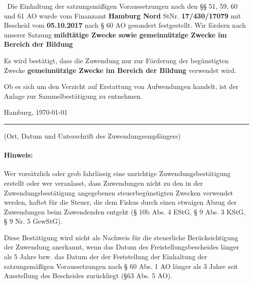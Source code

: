 \documentclass[12pt,ngerman]{scrartcl}
\newcommand{\marked}{\scalebox{1.5}{\XBox}~} %
\begin{document}
{{{\marked Die Einhaltung der satzungsmäßigen Voraussetzungen nach den §§ 51, 59, 60 und 61 AO wurde vom Finanzamt \textbf{Hamburg Nord} StNr. \textbf{17/430/17079} mit Bescheid vom \textbf{05.10.2017} nach § 60 AO gesondert festgestellt. Wir fördern nach unserer Satzung \textbf{mildtätige Zwecke sowie gemeinnützige Zwecke im Bereich der Bildung}
 
\begin{mdframed}[style=MyFormStyle]%
  Es wird bestätigt, dass die Zuwendung nur zur Förderung der
  begünstigten Zwecke \textbf{gemeinnützige Zwecke im Bereich der Bildung}
  verwendet wird.
\end{mdframed} 

{%

\vspace*{0.5em}Ob es sich um den Verzicht auf Erstattung von Aufwendungen handelt, ist der Anlage zur Sammelbestätigung zu entnehmen. {%

\vspace*{2.5em} 
Hamburg, \today
\hrule

\vspace*{0.5em} (Ort, Datum und Unterschrift des Zuwendungsempfängers) 

\paragraph{Hinweis:} Wer vorsätzlich oder grob fahrlässig eine unrichtige Zuwendungsbestätigung erstellt oder wer veranlasst, dass 
Zuwendungen nicht zu den in der Zuwendungsbestätigung angegebenen steuerbegünstigten Zwecken verwendet 
werden, haftet für die Steuer, die dem Fiskus durch einen etwaigen Abzug der Zuwendungen beim Zuwendenden entgeht (§ 10b Abs. 4 EStG, § 9 Abs. 3 KStG, § 9 Nr. 5 GewStG). 

Diese Bestätigung wird nicht als Nachweis für die steuerliche Berücksichtigung der Zuwendung anerkannt, wenn das Datum des Freistellungsbescheides länger als 5 Jahre bzw. das Datum der der Feststellung der Einhaltung der satzungsmäßigen Voraussetzungen nach § 60 Abs. 1 AO länger als 3 Jahre seit Ausstellung des Bescheides zurückliegt (§63 Abs. 5 AO). 

{%
\clearpage

}}}}}}
\end{document}
